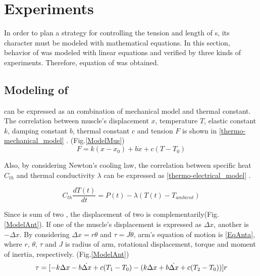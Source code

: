 \section{Experiments}\label{section_modeling}
In order to plan a strategy for controlling the tension and length of \scpnospace s, its character must be modeled with mathematical equations. In this section, behavior of \scp was modeled with linear equations and verified by three kinds of experiments. Therefore, equation of \anta was obtained.

\subsection{Modeling of \ANTA}\label{section_thermo_model}
\scp can be expressed as an combination of mechanical model and thermal constant. The correlation between muscle's displacement $x$, temperature $T$, elastic constant $k$, damping constant $b$, thermal constant $c$ and tension $F$ is shown in \eqref{thermo-mechanical_model} \cite{yip}.
(Fig.\ref{ModelMus})
\begin{equation} \label{thermo-mechanical_model}
F=k(x-x_0) + b\dot{x}+c(T-T_0)
\end{equation}

Also, by considering Newton's cooling law, the correlation between specific heat $C_{th}$ and thermal conductivity $\lambda$ can be expressed as \eqref{thermo-electrical_model} \cite{yip}.

\begin{equation} \label{thermo-electrical_model}
C_{th}\frac{dT(t)}{dt} = P(t) - \lambda(T(t)-T_{ambient})
\end{equation}

Since \anta is sum of two \scpnospace, the displacement of two \scp is complementarily(Fig.\ref{ModelAnt}). If one of the muscle's displacement is expressed as $\Delta{x}$, another is $-\Delta{x}$. By considering $\Delta{x}=r\theta$ and $\tau=J\ddot{\theta}$, arm's equation of motion is \eqref{EqAnta}, where $r$, $\theta$, $\tau$ and $J$ is radius of arm, rotational displacement, torque and moment of inertia, respectively.
(Fig.\ref{ModelAnt})
\begin{equation} %
\tau = [-k\Delta x-b\dot{\Delta x}+c(T_1-T_0) - (k\Delta x+b\dot{\Delta x}+c(T_2-T_0))]r \notag
\end{equation}

